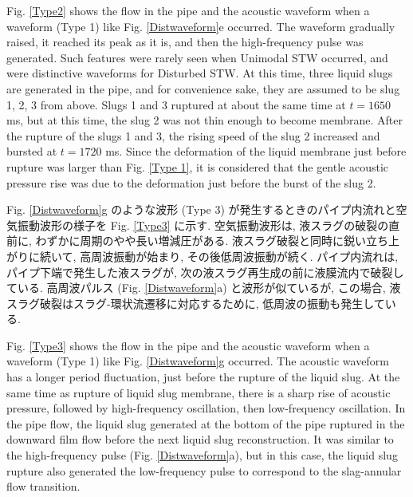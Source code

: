\documentclass[12pt]{article}
\begin{document}
Fig. \ref{Type2} shows the flow in the pipe and the acoustic waveform when a waveform (Type 1) like Fig. \ref {Distwaveform}e occurred.
The waveform gradually raised, it reached its peak as it is, and then the high-frequency pulse was generated.
Such features were rarely seen when Unimodal STW occurred, and were distinctive waveforms for Disturbed STW.
At this time, three liquid slugs are generated in the pipe, and for convenience sake, they are assumed to be slug 1, 2, 3 from above. 
Slugs 1 and 3 ruptured at about the same time at $ t = 1650 $ ms, but at this time, the slug 2 was not thin enough to become membrane.
After the rupture of the slugs 1 and 3, the rising speed of the slug 2 increased and bursted at $ t = 1720 $ ms.
Since the deformation of the liquid membrane just before rupture was larger than Fig. \ref {Type 1}, it is considered that the gentle acoustic pressure rise was due to the deformation just before the burst of the slug 2.



Fig. \ref{Distwaveform}g のような波形 (Type 3) が発生するときのパイプ内流れと空気振動波形の様子を Fig. \ref{Type3} に示す. 空気振動波形は, 液スラグの破裂の直前に, わずかに周期のやや長い増減圧がある. 
液スラグ破裂と同時に鋭い立ち上がりに続いて, 高周波振動が始まり, その後低周波振動が続く. 
パイプ内流れは, パイプ下端で発生した液スラグが, 次の液スラグ再生成の前に液膜流内で破裂している. 
高周波パルス (Fig. \ref{Distwaveform}a) と波形が似ているが, この場合, 液スラグ破裂はスラグ-環状流遷移に対応するために, 低周波の振動も発生している.


Fig. \ref{Type3} shows the flow in the pipe and the acoustic waveform when a waveform (Type 1) like Fig. \ref {Distwaveform}g occurred. 
The acoustic waveform has a longer period fluctuation, just before the rupture of the liquid slug.
At the same time as rupture of liquid slug membrane, there is a sharp rise of acoustic pressure, followed by high-frequency oscillation, then low-frequency oscillation. In the pipe flow, the liquid slug generated at the bottom of the pipe ruptured in the downward film flow before the next liquid slug reconstruction.
It was similar to the high-frequency pulse (Fig. \ref{Distwaveform}a), but in this case, the liquid slug rupture also generated the low-frequency pulse to correspond to the slag-annular flow transition.

\clearpage
\end{document}
